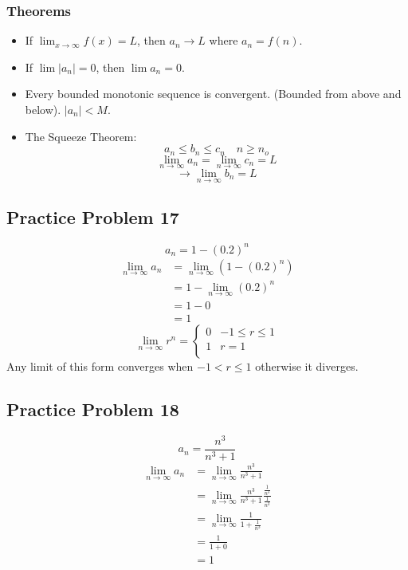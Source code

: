 \documentclass{math}
\begin{document}
\subsubsection*{Theorems}
\begin{itemize}
  \item If \( \lim_{x \to \infty}{f(x)} = L \), then \( a_{n} \rightarrow L \)
    where \( a_{n} = f(n) \).
  \item If \( \lim{|a_{n}|} = 0\), then \( \lim{a_{n}} = 0 \).
  \item Every bounded monotonic sequence is convergent. (Bounded from above and
    below). \( |a_{n}| < M \).
  \item The Squeeze Theorem:
    \[ a_{n} \leq b_{n} \leq c_{n} \quad n \geq n_{o} \]
    \[ \lim_{n\to\infty}{a_{n}} = \lim_{n\to\infty}{c_{n}} = L \]
    \[ \rightarrow \lim_{n\to\infty}{b_{n}} = L \]
\end{itemize}

\subsection*{Practice Problem 17}
\[ a_{n} = 1-(0.2)^{n} \]
\begin{align*}
  \lim_{n\to\infty}{a_{n}} &= \lim_{n\to\infty}{(1-(0.2)^{n})} \\
  &= 1-\lim_{n\to\infty}{(0.2)^{n}} \\
  &= 1-0 \\
  &= 1
\end{align*}
\[
  \lim_{n\to\infty}{r^{n}} =
  \begin{cases}
      0 & -1 \leq r \leq 1 \\
      1 & r = 1 \\
   \end{cases}
\]
Any limit of this form converges when \( -1 < r \leq 1 \) otherwise it
diverges.

\subsection*{Practice Problem 18}
\[ a_{n} = \frac{n^{3}}{n^{3}+1} \]
\begin{align*}
  \lim_{n\to\infty}{a_{n}} &= \lim_{n\to\infty}{\frac{n^{3}}{n^{3}+1}} \\
  &= \lim_{n\to\infty}
    {\frac{n^{3}}{n^{3}+1}\frac{\frac{1}{n^{3}}}{\frac{1}{n^{3}}}} \\
  &= \lim_{n\to\infty}{\frac{1}{1+\frac{1}{n^{3}}}} \\
  &= \frac{1}{1+0} \\
  &= 1
\end{align*}
\end{document}
